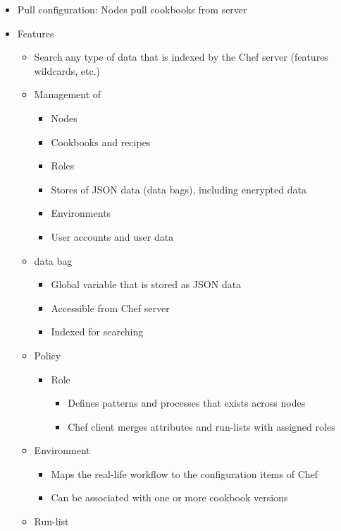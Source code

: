 \begin{itemize}
\begin{itemize}
\begin{itemize}
						\item Pull configuration: Nodes pull cookbooks from server
						\item Features
							\begin{itemize}
								\item Search any type of data that is indexed by the Chef server (features wildcards, etc.)
								\item Management of
								\begin{itemize}
									\item Nodes
									\item Cookbooks and recipes
									\item Roles
									\item Stores of JSON data (data bags), including encrypted data
									\item Environments
									\item User accounts and user data
								\end{itemize}
								\item data bag
									\begin{itemize}
										\item Global variable that is stored as JSON data
										\item Accessible from Chef server
										\item Indexed for searching
									\end{itemize}
								\item Policy
									 \begin{itemize}
									 	\item Role
										 	\begin{itemize}
										 		\item Defines patterns and processes that exists across nodes
										 		\item Chef client merges attributes and run-lists with assigned roles
										 	\end{itemize}
									 \end{itemize}
								\item Environment
									\begin{itemize}
										\item Maps the real-life workflow to the configuration items of Chef
										\item Can be associated with one or more cookbook versions
									\end{itemize}
								\item Run-list
									\begin{itemize}

\end{itemize}
\end{itemize}
\end{itemize}
\end{itemize}
\end{itemize}

